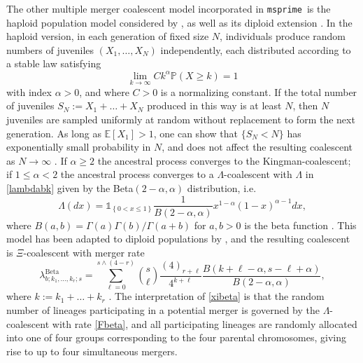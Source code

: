 \documentclass[9pt,twocolumn,twoside,lineno]{gsajnl}
\newcommand{\msprime}[0]{\texttt{msprime}}
\newcommand{\be}{\begin{equation}}
\newcommand{\ee}{\end{equation}}
\newcommand{\EE}[1]{\ensuremath{\mathds{E}\left[ #1 \right]}}%
\newcommand{\one}[1]{\ensuremath{\mathds{1}_{\left\{ #1 \right\}}}}%
\newcommand{\prb}[1]{\ensuremath{\mathds{P}\left( #1 \right) } }%
\begin{document}
The other multiple merger coalescent model incorporated in \msprime\ is
the haploid population model considered by \cite{schweinsberg03},
as well as its diploid extension \citep{BLS15}.  In the haploid
version, in each generation of fixed size $N$, individuals produce random numbers of
juveniles $(X_1, \ldots, X_N)$ independently, each distributed according to a stable law satisfying
\be\label{jX} \lim_{k\to \infty} C k^\alpha \prb{X \ge k} = 1 \ee
with index $\alpha > 0$, and where $C > 0$ is a normalizing constant.
If the  total number of juveniles $S_N := X_1 + \ldots + X_N$ produced
in this way is at least $N$, then $N$ juveniles are sampled uniformly at random
without replacement to form the next generation.
As long as $\EE{X_1} > 1$, one can show that $\{ S_N < N \}$ has exponentially small
probability in $N$, and does not affect the resulting coalescent as $N \to \infty$ \citep{schweinsberg03}.
If $\alpha \ge 2$ the ancestral process converges to the Kingman-coalescent; if
$1 \le \alpha < 2$ the ancestral process converges to a $\Lambda$-coalescent
with $\Lambda$ in \eqref{lambdabk} given by the Beta$(2-\alpha, \alpha)$ distribution, i.e.\
\be\label{Fbeta} \Lambda(dx) = \one{0< x \le 1} \frac{1}{B(2-\alpha,\alpha)}
x^{1 - \alpha}(1-x)^{\alpha - 1}  dx, \ee where
$B(a,b) = \Gamma(a)\Gamma(b)/\Gamma(a+b)$ for $a,b > 0$ is the
beta function \citep{schweinsberg03}.
This model has been adapted to diploid populations
by \cite{BLS15}, and the resulting coalescent is $\Xi$-coalescent with merger rate
\be\label{xibeta} \lambda_{b;k_1, \ldots, k_r; s}^{\text{Beta}} = \sum_{\ell = 0}^{ s\wedge (4-r) } \binom{s}{\ell} \frac{ (4)_{r+\ell} }{4^{k+\ell}}
\frac{B(k+\ell - \alpha, s-\ell + \alpha ) }{B(2-\alpha,\alpha)}, \ee
where $k := k_1 + \ldots + k_r$ \citep{blath2016site,BLS15}. The interpretation of \eqref{xibeta} is  that the
random number of lineages participating in a potential merger is governed by the
$\Lambda$-coalescent with rate \eqref{Fbeta}, and all participating lineages are
randomly allocated into one of four groups corresponding to the four parental
chromosomes, giving rise to up to four simultaneous mergers.
\end{document}
